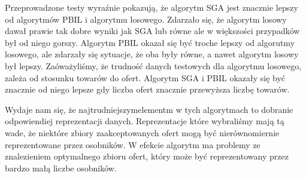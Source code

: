 Przeprowadzone testy wyraźnie pokazują, że algorytm SGA jest znacznie lepszy od algorytmów PBIL i algorytmu losowego.
Zdarzało się, że algorytm losowy dawał prawie tak dobre wyniki jak SGA lub równe ale w większości przypadków był od niego gorszy.
Algorytm PBIL okazał się być troche lepszy od algorutmy losowego, ale zdarzały się sytuacje, że oba były równe, a nawet algorytm losowy był lepszy.
Zaóważyliśmy, że trudność danych testowych dla algorytmu losowego, zależa od stosunku towarów do ofert.
Algorytm SGA i PBIL okazały się być znacznie od niego lepsze gdy liczba ofert znacznie przewyższa liczbę towarów.


Wydaje nam się, że najtrudniejszymelementm w tych algorytmach to dobranie odpowiendiej reprezentacji danych.
Reprezentacje które wybraliśmy mają tą wade, że niektóre zbiory zaakceptowanych ofert mogą być nierównomiernie reprezentowane przez osobników.
W efekcie algorytm ma problemy ze znalezieniem optymalnego zbioru ofert, który może być reprezentowany przez bardzo małą liczbe osobników.
